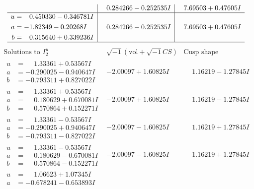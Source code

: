 \documentclass[1p]{elsarticle_modified}
\theoremstyle{definition}
\newcommand{\I}{\sqrt{-1}}
\begin{document}
$$\begin{array}{c|c|c}
 & \phantom{-}0.284266 - 0.252535 I & \phantom{-}7.69503 + 0.47605 I \\ \hline\begin{aligned}
u &= \phantom{-}0.450330 - 0.346781 I \\
a &= -1.82349 - 0.20268 I \\
b &= \phantom{-}0.315640 + 0.339236 I\end{aligned}
 & \phantom{-}0.284266 - 0.252535 I & \phantom{-}7.69503 + 0.47605 I\\
 \hline 
 \end{array}$$\newpage$$\begin{array}{c|c|c}  
\text{Solutions to }I^u_{2}& \I (\text{vol} + \sqrt{-1}CS) & \text{Cusp shape}\\
 \hline 
\begin{aligned}
u &= \phantom{-}1.33361 + 0.53567 I \\
a &= -0.290025 - 0.940647 I \\
b &= -0.793311 + 0.827022 I\end{aligned}
 & -2.00097 + 1.60825 I & \phantom{-}1.16219 - 1.27845 I \\ \hline\begin{aligned}
u &= \phantom{-}1.33361 + 0.53567 I \\
a &= \phantom{-}0.180629 + 0.670081 I \\
b &= \phantom{-}0.570864 + 0.152271 I\end{aligned}
 & -2.00097 + 1.60825 I & \phantom{-}1.16219 - 1.27845 I \\ \hline\begin{aligned}
u &= \phantom{-}1.33361 - 0.53567 I \\
a &= -0.290025 + 0.940647 I \\
b &= -0.793311 - 0.827022 I\end{aligned}
 & -2.00097 - 1.60825 I & \phantom{-}1.16219 + 1.27845 I \\ \hline\begin{aligned}
u &= \phantom{-}1.33361 - 0.53567 I \\
a &= \phantom{-}0.180629 - 0.670081 I \\
b &= \phantom{-}0.570864 - 0.152271 I\end{aligned}
 & -2.00097 - 1.60825 I & \phantom{-}1.16219 + 1.27845 I \\ \hline\begin{aligned}
u &= \phantom{-}1.06623 + 1.07345 I \\
a &= -0.678241 - 0.653893 I \\

\end{aligned}
\end{array}$$
\end{document}
